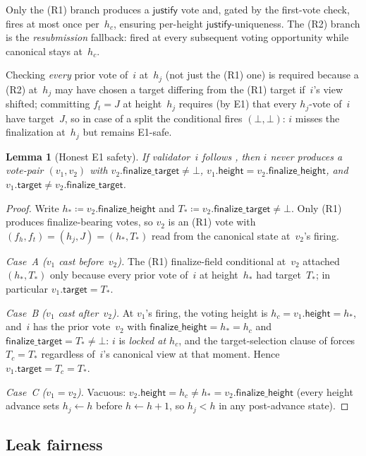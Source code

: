 \documentclass{article}
\newcommand{\target}{\mathsf{target}}
\newcommand{\height}{\mathsf{height}}
\newcommand{\just}{\ensuremath{\mathsf{justify}}\xspace}
\newcommand{\finalizeHeight}{\mathsf{finalize\_height}}
\newcommand{\finalizeTarget}{\mathsf{finalize\_target}}
\theoremstyle{plain}
\newtheorem{lemma}{Lemma}
\theoremstyle{definition}
\theoremstyle{remark}
\begin{document}
Only the (R1) branch produces a \just vote and, gated by the first-vote check, fires at most once per~$h_c$, ensuring per-height \just-uniqueness.
The (R2) branch is the \emph{resubmission} fallback: fired at every subsequent voting opportunity while canonical stays at~$h_c$.

Checking \emph{every} prior vote of~$i$ at~$h_j$ (not just the (R1) one) is required because a (R2) at~$h_j$ may have chosen a target differing from the (R1) target if~$i$'s view shifted; committing $f_t = J$ at height~$h_j$ requires (by E1) that every $h_j$-vote of~$i$ have target~$J$, so in case of a split the conditional fires $(\bot, \bot)$: $i$ misses the finalization at~$h_j$ but remains E1-safe.

\begin{lemma}[Honest E1 safety]\label{lem:honest-e1-safety}
If validator~$i$ follows , then $i$ never produces a vote-pair $(v_1, v_2)$ with $v_2.\finalizeTarget \neq \bot$, $v_1.\height = v_2.\finalizeHeight$, and $v_1.\target \neq v_2.\finalizeTarget$.
\end{lemma}

\begin{proof}
Write $h_\ast \coloneqq v_2.\finalizeHeight$ and $T_\ast \coloneqq v_2.\finalizeTarget \neq \bot$.
Only (R1) produces finalize-bearing votes, so $v_2$ is an (R1) vote with $(f_h, f_t) = (h_j, J) = (h_\ast, T_\ast)$ read from the canonical state at~$v_2$'s firing.

\emph{Case~A ($v_1$ cast before~$v_2$).}
The (R1) finalize-field conditional at~$v_2$ attached $(h_\ast, T_\ast)$ only because every prior vote of~$i$ at height~$h_\ast$ had target~$T_\ast$; in particular $v_1.\target = T_\ast$.

\emph{Case~B ($v_1$ cast after~$v_2$).}
At $v_1$'s firing, the voting height is $h_c = v_1.\height = h_\ast$, and~$i$ has the prior vote~$v_2$ with $\finalizeHeight = h_\ast = h_c$ and $\finalizeTarget = T_\ast \neq \bot$: $i$ is \emph{locked at $h_c$}, and the target-selection clause of  forces $T_c = T_\ast$ regardless of~$i$'s canonical view at that moment.
Hence $v_1.\target = T_c = T_\ast$.

\emph{Case~C ($v_1 = v_2$).}
Vacuous: $v_2.\height = h_c \neq h_\ast = v_2.\finalizeHeight$ (every height advance sets $h_j \gets h$ before $h \gets h + 1$, so $h_j < h$ in any post-advance state).
\end{proof}

\subsection{Leak fairness}
\end{document}
